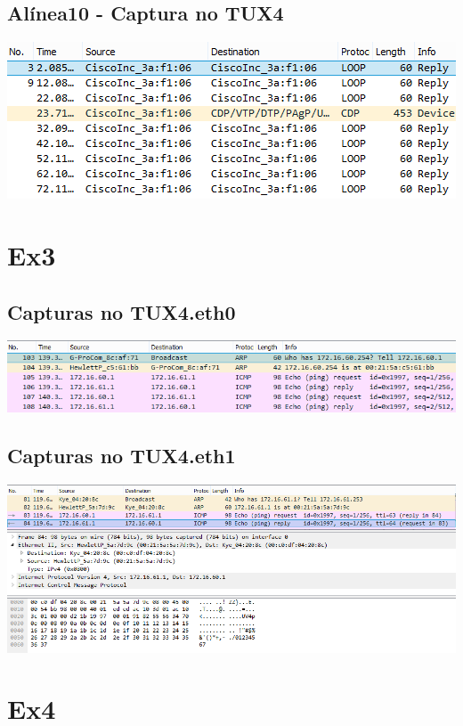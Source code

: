 \documentclass[11pt,a4paper,reqno]{report}
\numberwithin{equation}{section}
\begin{document}
\begin{appendices}
\subsection{Alínea10 - Captura no TUX4}
\includegraphics[width=18cm]{ex2_a10_tux4.png}

\section{Ex3}%

\subsection{Capturas no TUX4.eth0}
\label{ex3_eth0}
\includegraphics[width=18cm]{ex3_tux4eth0_ARP.png}

\subsection{Capturas no TUX4.eth1}
\label{ex3_eth1}
\includegraphics[width=18cm]{ex3_tux4eth1_pingdetailed.png}

\section{Ex4}%


\end{appendices}
\end{document}
